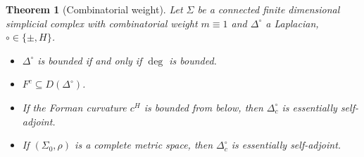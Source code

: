 \documentclass[10pt]{amsart}
\newtheorem{theorem}{Theorem}[section]
\theoremstyle{definition}
\renewcommand{\bullet}{{\circ}}
\begin{document}
\begin{theorem}[Combinatorial weight]\label{comb}
	Let $\Sigma$ be a connected finite dimensional simplicial complex with combinatorial weight $m \equiv 1$ and $\Delta^{\bullet}$ a Laplacian, $\bullet\in\{\pm,H\}$.
	\begin{itemize}
		\item [(a)] $\Delta^{\bullet}$ is bounded if and only if $\deg$ is bounded.
		\item [(b)]  $F^{c}\subseteq D(\Delta^{\bullet})$.
		\item [(c)] If the Forman curvature $c^{H}$ is bounded from below, then $\Delta^{\bullet}_{c}$ is essentially self-adjoint.
		\item [(d)] If $(\Sigma_{0},\rho)$ is a complete metric space, then $\Delta^{\bullet}_{c} $ is essentially self-adjoint.		
	\end{itemize}
\end{theorem}
\end{document}
